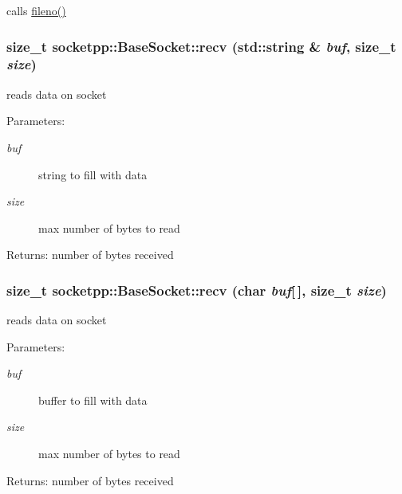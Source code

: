 \begin{CompactItemize}
calls \hyperlink{classsocketpp_1_1BaseSocket_c96db07cc917926d895d89cf73734ea1}{fileno()} 

\hypertarget{classsocketpp_1_1BaseSocket_25fc62d259f6d12f1b1a5001a7512897}{
\subsubsection[{recv}]{\setlength{\rightskip}{0pt plus 5cm}size\_\-t socketpp::BaseSocket::recv (std::string \& {\em buf}, \/  size\_\-t {\em size})}}
\label{classsocketpp_1_1BaseSocket_25fc62d259f6d12f1b1a5001a7512897}


reads data on socket 

\begin{Desc}
\item[Parameters:]
\begin{description}
\item[{\em buf}]string to fill with data \item[{\em size}]max number of bytes to read \end{description}
\end{Desc}
\begin{Desc}
\item[Returns:]number of bytes received \end{Desc}
\hypertarget{classsocketpp_1_1BaseSocket_08b3e29d019575293fa134c6d91d6cbb}{
\subsubsection[{recv}]{\setlength{\rightskip}{0pt plus 5cm}size\_\-t socketpp::BaseSocket::recv (char {\em buf}\mbox{[}$\,$\mbox{]}, \/  size\_\-t {\em size})}}
\label{classsocketpp_1_1BaseSocket_08b3e29d019575293fa134c6d91d6cbb}


reads data on socket 

\begin{Desc}
\item[Parameters:]
\begin{description}
\item[{\em buf}]buffer to fill with data \item[{\em size}]max number of bytes to read \end{description}
\end{Desc}
\begin{Desc}
\item[Returns:]number of bytes received \end{Desc}
\hypertarget{classsocketpp_1_1BaseSocket_ace82407e13a6eee26aa1f5f642d0cfc}{
}
\end{CompactItemize}
